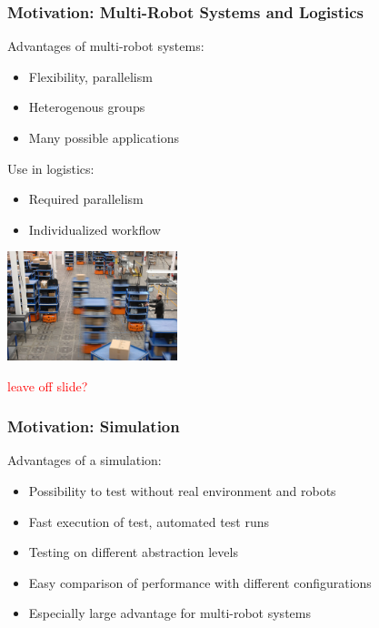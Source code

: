 \documentclass[]{beamer}
\begin{document}
\begin{frame}
  \frametitle{Motivation: Multi-Robot Systems and Logistics}
  \begin{multicols}{2}
  Advantages of multi-robot systems:
  \begin{itemize}
  \item Flexibility, parallelism
  \item Heterogenous groups %
  \item Many possible applications %
  \end{itemize}
  Use in logistics:
  \begin{itemize}
  \item Required parallelism
  \item Individualized workflow
  \end{itemize}
  \includegraphics[width=140pt]{../pics/kiva.jpg}
  \end{multicols}
  \textcolor{red}{leave off slide?}
\end{frame}

\begin{frame}
  \frametitle{Motivation: Simulation}
  Advantages of a simulation:
  \begin{itemize}
  \item Possibility to test without real environment and robots
  \item Fast execution of test, automated test runs
  \item Testing on different abstraction levels
  \item Easy comparison of performance with different configurations 
  \item Especially large advantage for multi-robot systems
  \end{itemize}
\end{frame}
\end{document}
